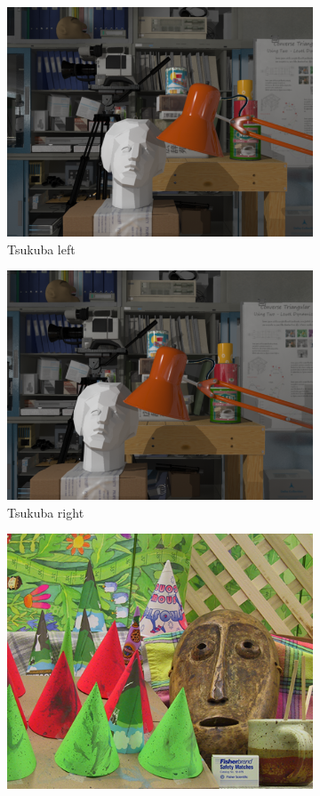 \begin{figure}[!htbp]
\begin{subfigure}{.5\textwidth}
  \centering
  \includegraphics[width=.8\linewidth]{figures/frame_1_left}
  \caption{Tsukuba left}
  \label{fig:sfig1}
\end{subfigure}%
\begin{subfigure}{.5\textwidth}
  \centering
  \includegraphics[width=.8\linewidth]{figures/frame_1_right}
  \caption{Tsukuba right}
  \label{fig:sfig2}
\end{subfigure}
\begin{subfigure}{.5\textwidth}
  \centering
  \includegraphics[width=.8\linewidth]{figures/ConeL}

\end{subfigure}
\end{figure}
